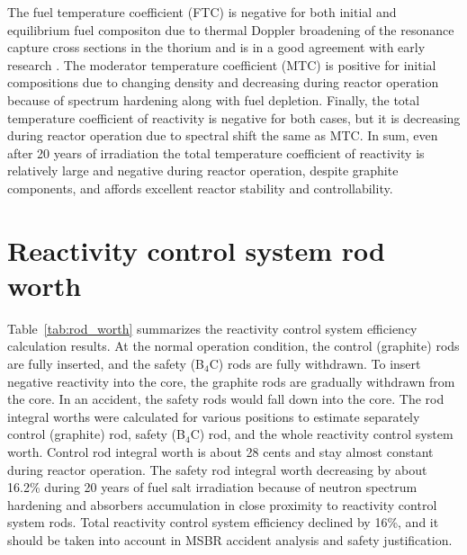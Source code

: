 The fuel temperature coefficient (FTC) is negative for both initial and equilibrium fuel compositon due to thermal Doppler broadening of the resonance capture cross sections in the thorium and is in a good agreement with early research \cite{robertson_conceptual_1971,park_whole_2015}. The moderator temperature coefficient (MTC) is positive for initial compositions due to changing density and decreasing during reactor operation because of spectrum hardening along with fuel depletion. Finally, the total temperature coefficient of reactivity is negative for both cases, but it is decreasing during reactor operation due to spectral shift the same as MTC. In sum, even after 20 years of irradiation the total temperature coefficient of reactivity is relatively large and negative during reactor operation, despite graphite components, and affords excellent reactor stability and controllability.

\section{Reactivity control system rod worth}
Table~\ref{tab:rod_worth} summarizes the reactivity control system efficiency calculation results. At the normal operation condition, the control (graphite) rods are fully inserted, and the safety (B$_4$C) rods are fully withdrawn. To insert negative reactivity into the core, the graphite rods are gradually withdrawn from the core. In an accident, the safety rods would fall down into the core. The rod integral worths were calculated for various positions to estimate separately control (graphite) rod, safety (B$_4$C) rod, and the whole reactivity control system worth. Control rod integral worth is about 28 cents and stay almost constant during reactor operation. The safety rod integral worth decreasing by about 16.2\% during 20 years of fuel salt irradiation because of neutron spectrum hardening and absorbers accumulation in close proximity to reactivity control system rods. Total reactivity control system efficiency declined by 16\%, and it should be taken into account in \gls{MSBR} accident analysis and safety justification.

